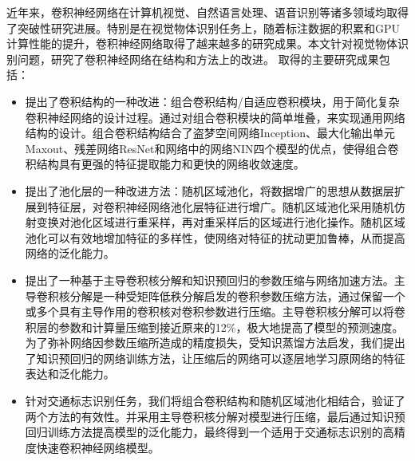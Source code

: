 \begin{cabstract}
  
 近年来，卷积神经网络在计算机视觉、自然语言处理、语音识别等诸多领域均取得了突破性研究进展。特别是在视觉物体识别任务上，随着标注数据的积累和GPU计算性能的提升，卷积神经网络取得了越来越多的研究成果。本文针对视觉物体识别问题，研究了卷积神经网络在结构和方法上的改进。 取得的主要研究成果包括：
  
  \begin{itemize}
    \item 提出了卷积结构的一种改进：组合卷积结构/自适应卷积模块，用于简化复杂卷积神经网络的设计过程。通过对组合卷积模块的简单堆叠，来实现通用网络结构的设计。组合卷积结构结合了盗梦空间网络Inception、最大化输出单元Maxout、残差网络ResNet和网络中的网络NIN四个模型的优点，使得组合卷积结构具有更强的特征提取能力和更快的网络收敛速度。
    \item 提出了池化层的一种改进方法：随机区域池化，将数据增广的思想从数据层扩展到特征层，对卷积神经网络池化层特征进行增广。随机区域池化采用随机仿射变换对池化区域进行重采样，再对重采样后的区域进行池化操作。随机区域池化可以有效地增加特征的多样性，使网络对特征的扰动更加鲁棒，从而提高网络的泛化能力。
    \item 提出了一种基于主导卷积核分解和知识预回归的参数压缩与网络加速方法。主导卷积核分解是一种受矩阵低秩分解启发的卷积参数压缩方法，通过保留一个或多个具有主导作用的卷积核对卷积参数进行压缩。主导卷积核分解可以将卷积层的参数和计算量压缩到接近原来的12\%，极大地提高了模型的预测速度。为了弥补网络因参数压缩所造成的精度损失，受知识蒸馏方法启发，我们提出了知识预回归的网络训练方法，让压缩后的网络可以逐层地学习原网络的特征表达和泛化能力。
    \item 针对交通标志识别任务，我们将组合卷积结构和随机区域池化相结合，验证了两个方法的有效性。并采用主导卷积核分解对模型进行压缩，最后通过知识预回归训练方法提高模型的泛化能力，最终得到一个适用于交通标志识别的高精度快速卷积神经网络模型。
   \end{itemize}

 
  
 \end{cabstract}


